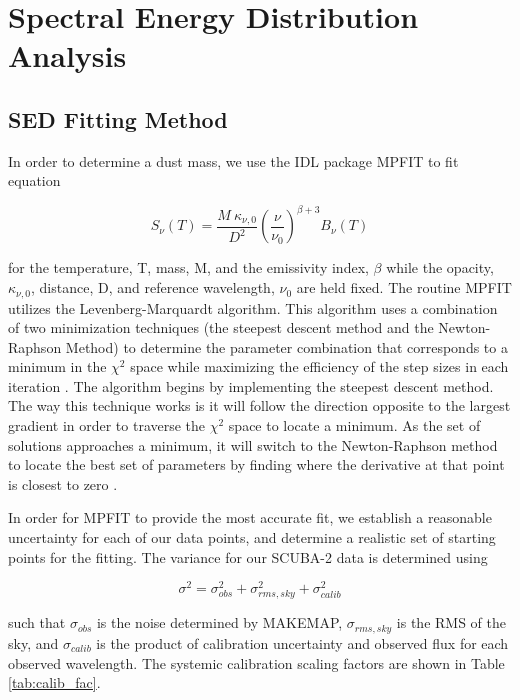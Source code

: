 \chapter{Spectral Energy Distribution Analysis}\label{sed}

\section{SED Fitting Method}

In order to determine a dust mass, we use the IDL package MPFIT \citep{markwardt2009} to fit equation 

\begin{equation}\label{eq:mod_sed}
  S_\nu\left(T\right) = \frac{M\:\kappa_{\nu,0}}{D^2}\left(\frac{\nu}{\nu_0}\right)^{\beta+3} B_\nu\left(T\right)
\end{equation}

\noindent for the temperature, T, mass, M, and the emissivity index, $\beta$ while the opacity, $\kappa_{\nu, 0}$, distance, D, and reference wavelength, $\nu_0$ are held fixed.  The routine MPFIT utilizes the Levenberg-Marquardt algorithm.  This algorithm uses a combination of two minimization techniques (the steepest descent method and the Newton-Raphson Method) to determine the parameter combination that corresponds to a minimum in the $\chi^2$ space while maximizing the efficiency of the step sizes in each iteration \citep{burden2001}.  The algorithm begins by implementing the steepest descent method.  The way this technique works is it will follow the direction opposite to the largest gradient in order to traverse the $\chi^2$ space to locate a minimum.  As the set of solutions approaches a minimum, it will switch to the Newton-Raphson method to locate the best set of parameters by finding where the derivative at that point is closest to zero \citep{gavin2013}.  

In order for MPFIT to provide the most accurate fit, we establish a reasonable uncertainty for each of our data points, and determine a realistic set of starting points for the fitting.  The variance for our SCUBA-2 data is determined using

\begin{equation}\label{eq:sc2noi}
  \sigma^2 = \sigma_{obs}^2 + \sigma_{rms,sky}^2 + \sigma_{calib}^2
\end{equation}

\noindent such that $\sigma_{obs}$ is the noise determined by MAKEMAP, $\sigma_{rms,sky}$ is the RMS of the sky, and $\sigma_{calib}$ is the product of calibration uncertainty and observed flux for each observed wavelength.  The systemic calibration scaling factors are shown in Table \ref{tab:calib_fac}.

